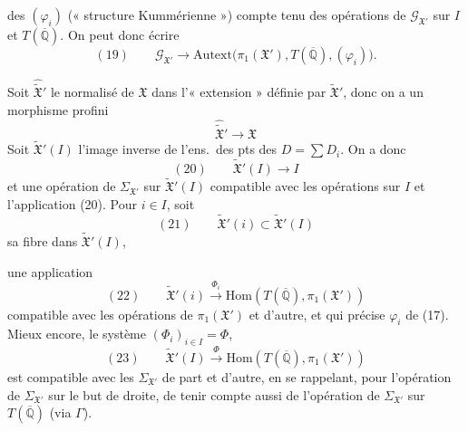 \documentclass[11pt,a4paper]{article}
\begin{document}
des $(\varphi_i)$ (« structure Kummérienne ») compte tenu des opérations
 de $\mathcal{G}_{\mathfrak{X}'}$ sur
$I$ et $T(\overline{\mathbb{Q}})$. On peut donc écrire
\[
  (19)\qquad \mathcal{G}_{\mathfrak{X}'} \longrightarrow
  \mathrm{Autext}\bigl(\pi_1(\mathfrak{X}'), T(\overline{\mathbb{Q}}), (\varphi_i)\bigr).
\]

 Soit $\widehat{\widetilde{\mathfrak{X}}}{}'$
le normalisé de $\mathfrak{X}$ \struck{\ill{}} dans l'« extension » définie par
$\widetilde{\mathfrak{X}}'$, donc on a un morphisme profini
\[
  \widehat{\widetilde{\mathfrak{X}}}{}' \longrightarrow \mathfrak{X}
\]
Soit $\widetilde{\mathfrak{X}}'(I)$ l'image inverse de l'ens.\ des pts
  des $D = \sum D_i$.
On a donc
\[
  (20)\qquad \widetilde{\mathfrak{X}}'(I) \longrightarrow I
\]
et une opération de \struck{\ill{}} $\Sigma_{\mathfrak{X}'}$ sur
$\widetilde{\mathfrak{X}}'(I)$ 
compatible avec les opérations sur $I$ et l'application (20). Pour $i \in I$,
soit
\[
  (21)\qquad \widetilde{\mathfrak{X}}'(i) \subset \widetilde{\mathfrak{X}}'(I)
\]
sa fibre dans $\widetilde{\mathfrak{X}}'(I)$, \ill{}

une application
\[
  (22)\qquad \widetilde{\mathfrak{X}}'(i) \xrightarrow{\ \Phi_i\ }
  \mathrm{Hom}(T(\overline{\mathbb{Q}}), \pi_1(\mathfrak{X}'))
\]
compatible avec les opérations de $\pi_1(\mathfrak{X}')$  et
d'autre, et qui précise  $\varphi_i$ de (17). Mieux
encore, le système $(\Phi_i)_{i \in I} = \Phi$,
\[
  (23)\qquad \widetilde{\mathfrak{X}}'(I) \xrightarrow{\ \Phi\ }
  \mathrm{Hom}(T(\overline{\mathbb{Q}}), \pi_1(\mathfrak{X}'))
\]
est compatible avec les $\Sigma_{\mathfrak{X}'}$ de part et d'autre, en
se rappelant, pour l'opération de $\Sigma_{\mathfrak{X}'}$ sur le but de
droite, de tenir compte aussi de l'opération de $\Sigma_{\mathfrak{X}'}$
sur $T(\overline{\mathbb{Q}})$ (via $\Gamma$).
\end{document}
